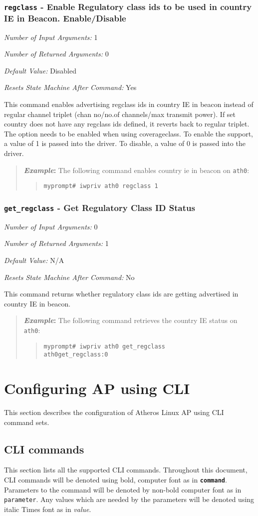 \documentclass[10pt,fullpage]{article}
\newcommand{\mytt}[1]{{\texttt{#1}}}
\newcommand{\bv}{\begin{verse}}
\newcommand{\ev}{\end{verse}}
\newcommand{\cmd}[1]{{\texttt{myprompt\# #1}}}
\newcommand{\argdesc}[4]{\begin{description}
\itemsep -6pt
\item \textit{Number of Input Arguments:} #1
\item \textit{Number of Returned Arguments:} #2
\item \textit{Default Value:} #3
\item \textit{Resets State Machine After Command:} #4
\end{description}
}
\newcommand{\clicmd}[1]{{\textbf{\texttt{#1}}}}
\newcommand{\cliparam}[1]{{\texttt{#1}}}
\newcommand{\clival}[1]{{\emph{#1}}}
\newenvironment{example}{\begin{quote}\textbf{\textit{Example}:}}{\end{quote}}
\begin{document}
\subsubsection{\mytt{regclass} - Enable Regulatory class ids to be used in country 
IE in Beacon. Enable/Disable}
\argdesc{1}{0}{Disabled}{Yes}
This command enables advertising regclass ids in country IE in beacon instead of 
regular channel triplet (chan no/no.of channels/max transmit power). If set 
country does not have any regclass ids defined, it reverts back to regular triplet. 
The option needs to be enabled when using coverageclass. To enable the support, a value 
of 1 is passed into the driver.  To disable, a value of 0 is passed into the driver.
\begin{example}
  The following command enables country ie in beacon  on \mytt{ath0}:
  \bv
  \cmd{iwpriv ath0 regclass 1}
  \ev
\end{example}

\subsubsection{\mytt{get\_regclass} - Get Regulatory Class ID Status}
\argdesc{0}{1}{N/A}{No}
This command returns whether regulatory class ids are getting advertised in country 
IE in beacon.
\begin{example}
  The following command retrieves the country IE status on \mytt{ath0}:
  \bv
  \cmd{iwpriv ath0 get\_regclass}\\
  \mytt{ath0\hspace{32pt}get\_regclass:0}
  \ev
\end{example}

\section{Configuring AP using CLI}
This section describes the configuration of Atheros Linux AP using CLI command sets.

\subsection{CLI commands}
This section lists all the supported CLI commands.  Throughout this
document, CLI commands will be denoted using bold, computer font as in
\clicmd{command}.  Parameters to the command will be denoted by
non-bold computer font as in \cliparam{parameter}.  Any values which
are needed by the parameters will be denoted using italic Times font
as in \clival{value}.
\end{document}
